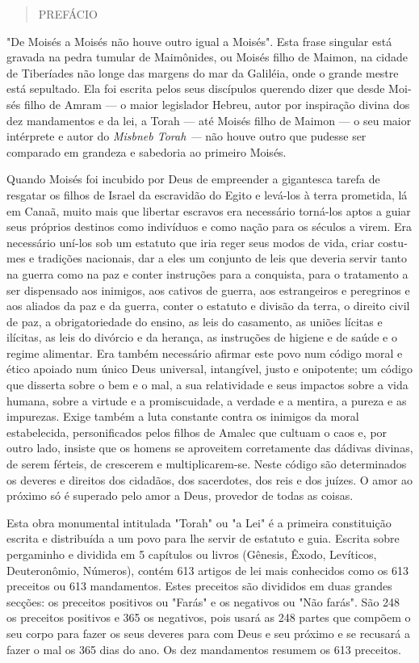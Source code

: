 \begin{quote}
PREFÁCIO
\end{quote}

"De Moisés a Moisés não houve outro igual a Moisés". Esta frase
singu­lar está gravada na pedra tumular de Maimônides, ou Moisés filho
de Maimon, na cidade de Tiberíades não longe das margens do mar da
Galiléia, onde o grande mestre está sepultado. Ela foi escrita pelos
seus discípulos querendo dizer que desde Moi­sés filho de Amram --- o
maior legislador Hebreu, autor por inspiração divina dos dez mandamentos
e da lei, a Torah --- até Moisés filho de Maimon --- o seu maior
intérprete e autor do \emph{Misbneb Torah ---} não houve outro que
pudesse ser compara­do em grandeza e sabedoria ao primeiro Moisés.

Quando Moisés foi incubido por Deus de empreender a gigantesca tare­fa
de resgatar os filhos de Israel da escravidão do Egito e levá-los à
terra prometida, lá em Canaã, muito mais que libertar escravos era
necessário torná-los aptos a guiar seus próprios destinos como
indivíduos e como nação para os séculos a virem. Era necessário uní-los
sob um estatuto que iria reger seus modos de vida, criar costu­mes e
tradições nacionais, dar a eles um conjunto de leis que deveria servir
tanto na guerra como na paz e conter instruções para a conquista, para o
tratamento a ser dispensado aos inimigos, aos cativos de guerra, aos
estrangeiros e peregrinos e aos aliados da paz e da guerra, conter o
estatuto e divisão da terra, o direito civil de paz, a obrigatoriedade
do ensino, as leis do casamento, as uniões lícitas e ilícitas, as leis
do divórcio e da herança, as instruções de higiene e de saúde e o regime
alimentar. Era também necessário afirmar este povo num código moral e
ético apoia­do num único Deus universal, intangível, justo e onipotente;
um código que dis­serta sobre o bem e o mal, a sua relatividade e seus
impactos sobre a vida humana, sobre a virtude e a promiscuidade, a
verdade e a mentira, a pureza e as impurezas. Exige também a luta
constante contra os inimigos da moral estabelecida, personifi­cados
pelos filhos de Amalec que cultuam o caos e, por outro lado, insiste que
os homens se aproveitem corretamente das dádivas divinas, de serem
férteis, de cres­cerem e multiplicarem-se. Neste código são determinados
os deveres e direitos dos cidadãos, dos sacerdotes, dos reis e dos
juízes. O amor ao próximo só é superado pelo amor a Deus, provedor de
todas as coisas.

Esta obra monumental intitulada "Torah" ou "a Lei" é a primeira
cons­tituição escrita e distribuída a um povo para lhe servir de
estatuto e guia. Escrita sobre pergaminho e dividida em 5 capítulos ou
livros (Gênesis, Êxodo, Levíticos, Deuteronômio, Números), contém 613
artigos de lei mais conhecidos como os 613 preceitos ou 613 mandamentos.
Estes preceitos são divididos em duas grandes sec­ções: os preceitos
positivos ou "Farás" e os negativos ou "Não farás". São 248 os preceitos
positivos e 365 os negativos, pois usará as 248 partes que compõem o seu
corpo para fazer os seus deveres para com Deus e seu próximo e se
recusará a fazer o mal os 365 dias do ano. Os dez mandamentos resumem os
613 preceitos.

